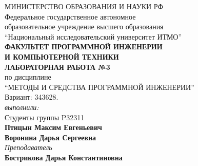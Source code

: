 \thispagestyle{empty}
\BgThispage
\begin{center}
	МИНИСТЕРСТВО ОБРАЗОВАНИЯ И НАУКИ РФ\\
	\hfill \break
	Федеральное государственное автономное\\
	образовательное учреждение высшего образования\\
	``Национальный исследовательский университет ИТМО''\\
	\hfill \break
	\textbf{ФАКУЛЬТЕТ ПРОГРАММНОЙ ИНЖЕНЕРИИ \\
	И КОМПЬЮТЕРНОЙ ТЕХНИКИ}\\
	\vspace{2cm}
	\large{\textbf{ЛАБОРАТОРНАЯ РАБОТА №3}}\\
	\hfill \break
	по дисциплине\\
		\large{``МЕТОДЫ И СРЕДСТВА ПРОГРАММНОЙ ИНЖЕНЕРИИ''}\\
	\hfill \break
	Вариант: 343628. \\
	\vspace{3cm}
	\textit{выполнили:}\\
	Студенты группы P32311\\
	\textbf{Птицын Максим Евгеньевич}\\
	\textbf{Воронина Дарья Сергеевна}\\
	\textit{Преподаватель}\\
	\textbf{Бострикова Дарья Константиновна}
\end{center}

\thispagestyle{empty}
\newpage